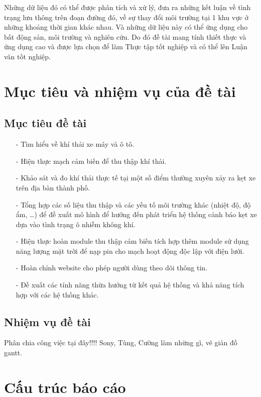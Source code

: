 Những dữ liệu đó có thể được phân tích và xử lý, đưa ra những kết luận về tình trạng lưu thông trên đoạn đường đó, về sự thay đổi môi trường tại 1 khu vực ở những khoảng thời gian khác nhau. Và những dữ liệu này có thể ứng dụng cho bất động sản, môi trường và nghiên cứu. Do đó đề tài mang tính thiết thực và ứng dụng cao và được lựa chọn để làm Thực tập tốt nghiệp và có thể lên Luận văn tốt nghiệp.




\section{Mục tiêu và nhiệm vụ của đề tài} %
\label{section1.2}
\subsection{Mục tiêu đề tài}
\begin{itemize}
\item[-]Tìm hiểu về khí thải xe máy và ô tô.

\item[-]Hiện thực mạch cảm biến để thu thập khí thải.

\item[-]Khảo sát và đo khí thải thực tế tại một số điểm thường xuyên xảy ra kẹt xe trên địa bàn thành phố.

\item[-]Tổng hợp các số liệu thu thập và các yếu tố môi trường khác (nhiệt độ, độ ẩm, …) để đề xuất mô hình để hướng đến phát triển hệ thống cảnh báo kẹt xe dựa vào tình trạng ô nhiễm không khí.

\item[-]Hiện thực hoàn module thu thập cảm biến tích hợp thêm module sử dụng năng lượng mặt trời để nạp pin cho mạch hoạt động độc lập với điện lưới.
\item[-]Hoàn chỉnh website cho phép người dùng theo dõi thông tin.
\item[-]Đề xuất các tính năng thừa hưởng từ kết quả hệ thống và khả năng tích hợp với các hệ thống khác.


\end{itemize}

\subsection{Nhiệm vụ đề tài}
Phân chia công việc tại đây!!!! Sony, Tùng, Cường làm nhừng gì, vẽ giản đồ gantt.

\section{Cấu trúc báo cáo} %
